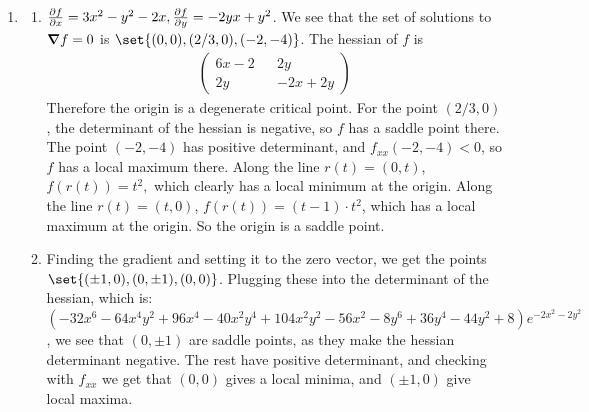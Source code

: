 \documentclass[12pt]{article}
\theoremstyle{definition}
\theoremstyle{remark}
\begin{document}
\begin{enumerate}[leftmargin=\labelsep]
	\item
	\begin{enumerate}
		\item $\pdv{f}{x} = 3x^2-y^2-2x, \pdv{f}{y} = -2yx+y^2$. We see that the set of solutions to $\grad{f} = 0$ is $\set{(0, 0), (2/3, 0), (-2, -4)}$. The hessian of $f$ is 
		\begin{align*}
			\begin{pmatrix}
				6x-2 && 2y \\
				2y && -2x+2y
			\end{pmatrix}
		\end{align*}
		Therefore the origin is a degenerate critical point. For the point $(2/3, 0)$, the determinant of the hessian is negative, so $f$ has a saddle point there. The point $(-2, -4)$ has positive determinant, and $f_{xx}(-2, -4) < 0$, so $f$ has a local maximum there. Along the line $r(t) = (0, t)$, $f(r(t))=t^2,$ which clearly has a local minimum at the origin. Along the line $r(t) = (t, 0)$, $f(r(t)) = (t-1) \cdot t^2$, which has a local maximum at the origin. So the origin is a saddle point.
		
		\item 
		Finding the gradient and setting it to the zero vector, we get the points $\set{(\pm 1, 0), (0, \pm 1), (0, 0)}$. Plugging these into the determinant of the hessian, which is: $(-32x^6-64x^4y^2+96x^4-40x^2y^4+104x^2y^2-56x^2-8y^6+36y^4-44y^2+8)e^{-2x^2-2y^2}$, we see that $(0, \pm 1)$ are saddle points, as they make the hessian determinant negative. The rest have positive determinant, and checking with $f_{xx}$ we get that $(0, 0)$ gives a local minima, and $(\pm 1, 0)$ give local maxima.
		

\end{enumerate}
\end{enumerate}
\end{document}
